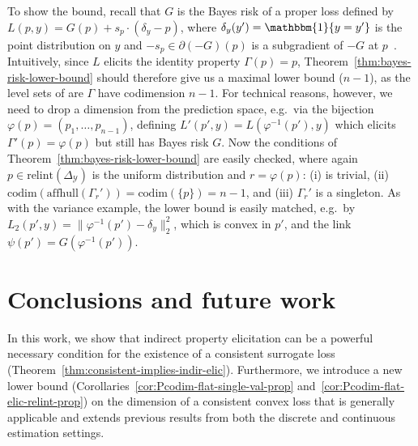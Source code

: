 \documentclass[anon,12pt]{colt2021} %
\newcommand{\simplex}{\Delta_\Y}
\newcommand{\relint}[1]{\mathrm{relint}(#1)}
\newcommand{\codim}{\mathrm{codim}}
\newcommand{\affhull}{\mathrm{affhull}}
\newcommand{\Y}{\mathcal{Y}}
\newcommand{\ones}{\mathbbm{1}}
\begin{document}
To show the bound, recall that $G$ is the Bayes risk of a proper loss defined by $L(p,y) = G(p) + s_p \cdot (\delta_y - p)$, where $\delta_y(y') = \ones\{y=y'\}$ is the point distribution on $y$ and $-s_p \in \partial (-G)(p)$ is a subgradient of $-G$ at $p$~\citep{gneiting2007strictly,reid2009surrogate,frongillo2014general}.
Intuitively, since $L$ elicits the identity property $\Gamma(p)=p$, Theorem~\ref{thm:bayes-risk-lower-bound} should therefore give us a maximal lower bound ($n-1$), as the level sets of are $\Gamma$ have codimension $n-1$.
For technical reasons, however, we need to drop a dimension from the prediction space, e.g.\ via the bijection $\varphi(p) = (p_1,\ldots,p_{n-1})$, defining $L'(p',y) = L(\varphi^{-1}(p'),y)$ which elicits $\Gamma'(p) = \varphi(p)$ but still has Bayes risk $G$.
Now the conditions of Theorem~\ref{thm:bayes-risk-lower-bound} are easily checked, where again $p\in\relint\simplex$ is the uniform distribution and $r=\varphi(p)$: (i) is trivial, (ii) $\codim(\affhull(\Gamma_r')) = \codim(\{p\}) = n-1$, and (iii) $\Gamma_r'$ is a singleton.
As with the variance example, the lower bound is easily matched, e.g.\ by $L_2(p',y) = \|\varphi^{-1}(p')-\delta_y\|_2^2$, which is convex in $p'$, and the link $\psi(p') = G(\varphi^{-1}(p'))$.


\section{Conclusions and future work}\label{sec:conclusions}
In this work, we show that indirect property elicitation can be a powerful necessary condition for the existence of a consistent surrogate loss (Theorem~\ref{thm:consistent-implies-indir-elic}).
Furthermore, we introduce a new lower bound (Corollaries~\ref{cor:Pcodim-flat-single-val-prop} and~\ref{cor:Pcodim-flat-elic-relint-prop}) on the dimension of a consistent convex loss that is generally applicable and extends previous results from both the discrete and continuous estimation settings.
\end{document}
